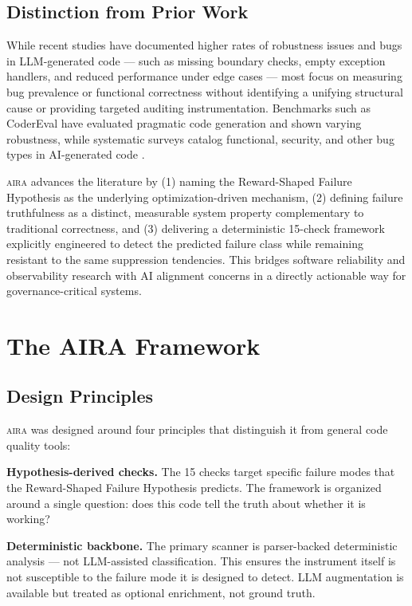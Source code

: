 \documentclass[11pt]{article}
\newcommand{\aira}{\textsc{aira}}
\begin{document}
\subsection{Distinction from Prior Work}

While recent studies have documented higher rates of robustness issues and bugs in
LLM-generated code --- such as missing boundary checks, empty exception handlers, and reduced
performance under edge cases --- most focus on measuring bug prevalence or functional
correctness without identifying a unifying structural cause or providing targeted auditing
instrumentation. Benchmarks such as CoderEval \citep{yu2024codereval} have evaluated
pragmatic code generation and shown varying robustness, while systematic surveys catalog
functional, security, and other bug types in AI-generated code \citep{gao2025survey}.

\aira{} advances the literature by (1) naming the Reward-Shaped Failure Hypothesis as the
underlying optimization-driven mechanism, (2) defining failure truthfulness as a distinct,
measurable system property complementary to traditional correctness, and (3) delivering a
deterministic 15-check framework explicitly engineered to detect the predicted failure class
while remaining resistant to the same suppression tendencies. This bridges software
reliability and observability research with AI alignment concerns in a directly actionable
way for governance-critical systems.

\section{The AIRA Framework}
\label{sec:framework}

\subsection{Design Principles}

\aira{} was designed around four principles that distinguish it from general code quality
tools:

\textbf{Hypothesis-derived checks.} The 15 checks target specific failure modes that the
Reward-Shaped Failure Hypothesis predicts. The framework is organized around a single
question: does this code tell the truth about whether it is working?

\textbf{Deterministic backbone.} The primary scanner is parser-backed deterministic analysis
--- not LLM-assisted classification. This ensures the instrument itself is not susceptible
to the failure mode it is designed to detect. LLM augmentation is available but treated as
optional enrichment, not ground truth.
\end{document}

